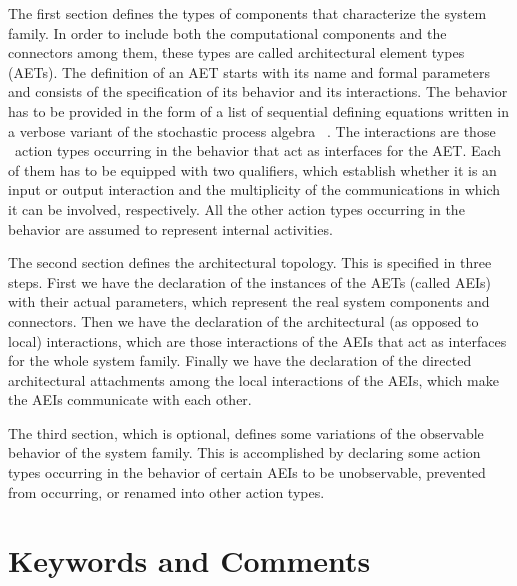 The first section defines the types of components that characterize the system family. In order to include
both the computational components and the connectors among them, these types are called architectural
element types (AETs). The definition of an AET starts with its name and formal parameters and consists of
the specification of its behavior and its interactions. The behavior has to be provided in the form of a
list of sequential defining equations written in a verbose variant of the stochastic process algebra
\empagr~\cite{Ber1,BB2,BB1}. The interactions are those \empagr\ action types occurring in the behavior that
act as interfaces for the AET. Each of them has to be equipped with two qualifiers, which establish whether
it is an input or output interaction and the multiplicity of the communications in which it can be involved,
respectively. All the other action types occurring in the behavior are assumed to represent internal
activities.

The second section defines the architectural topology. This is specified in three steps. First we have the
declaration of the instances of the AETs (called AEIs) with their actual parameters, which represent the
real system components and connectors. Then we have the declaration of the architectural (as opposed to
local) interactions, which are those interactions of the AEIs that act as interfaces for the whole system
family. Finally we have the declaration of the directed architectural attachments among the local
interactions of the AEIs, which make the AEIs communicate with each other.

The third section, which is optional, defines some variations of the observable behavior of the system
family. This is accomplished by declaring some action types occurring in the behavior of certain AEIs to be
unobservable, prevented from occurring, or renamed into other action types.



\section{Keywords and Comments}\label{keywords}

